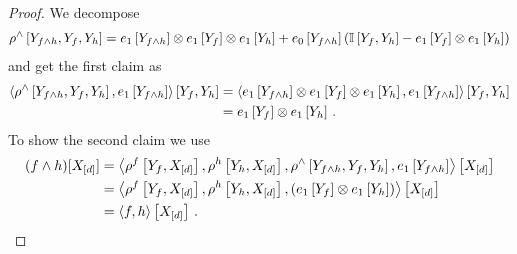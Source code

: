 \begin{proof}
    We decompose
    \begin{align*}
        \rho^{\land}\left[Y_{f\land h},Y_{f},Y_{h}\right]
        = e_1\left[Y_{f\land h}\right] \otimes e_1\left[Y_{f}\right] \otimes e_1\left[Y_{h}\right]
        + e_0\left[Y_{f\land h}\right] \left( \mathbb{I}\left[Y_{f},Y_{h}\right] -  e_1\left[Y_{f}\right] \otimes e_1\left[Y_{h}\right] \right)
    \end{align*}
    and get the first claim as
    \begin{align*}
        \left\langle 
            \rho^{\land}\left[Y_{f\land h},Y_{f},Y_{h}\right],e_1\left[Y_{f\land h}\right]
        \right\rangle \left[ Y_{f},Y_{h} \right]
        & = \left\langle 
            e_1\left[Y_{f\land h}\right] \otimes e_1\left[Y_{f}\right] \otimes e_1\left[Y_{h}\right],e_1\left[Y_{f\land h}\right]
        \right\rangle \left[ Y_{f},Y_{h} \right] \\
        & = e_1\left[Y_{f}\right] \otimes e_1\left[Y_{h}\right] \, .
    \end{align*}
    To show the second claim we use
    \begin{align*}
    (f\land h)[X_{[d]}]
        &= \left\langle 
            \rho^{f}\left[Y_{f},X_{[d]}\right],
            \rho^{h}\left[Y_{h},X_{[d]}\right],
            \rho^{\land}\left[Y_{f\land h},Y_{f},Y_{h}\right],
            e_1\left[Y_{f\land h}\right]
        \right\rangle \left[ X_{[d]} \right] \\
        &  = \left\langle 
            \rho^{f}\left[Y_{f},X_{[d]}\right],
            \rho^{h}\left[Y_{h},X_{[d]}\right],
            (e_1\left[Y_{f}\right]\otimes e_1\left[Y_{h}\right])
        \right\rangle \left[ X_{[d]} \right] \\
        &= \left\langle f,h\right\rangle \left[ X_{[d]} \right] \, .
    \end{align*}
\end{proof}

